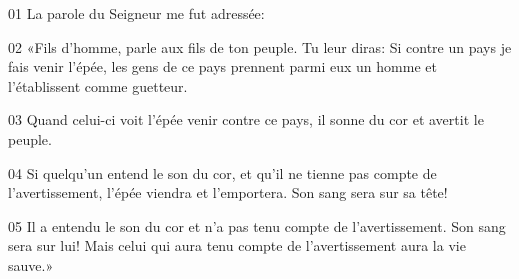 01 La parole du Seigneur me fut adressée:

02 «Fils d’homme, parle aux fils de ton peuple. Tu leur diras: Si contre un pays je fais venir l’épée, les gens de ce pays prennent parmi eux un homme et l’établissent comme guetteur.

03 Quand celui-ci voit l’épée venir contre ce pays, il sonne du cor et avertit le peuple.

04 Si quelqu’un entend le son du cor, et qu’il ne tienne pas compte de l’avertissement, l’épée viendra et l’emportera. Son sang sera sur sa tête!

05 Il a entendu le son du cor et n’a pas tenu compte de l’avertissement. Son sang sera sur lui! Mais celui qui aura tenu compte de l’avertissement aura la vie sauve.»
